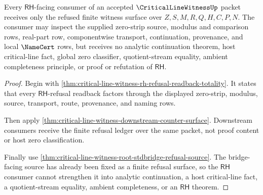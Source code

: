 \begin{theorem}
\label{thm:critical-line-witness-root-rh-refusal-exhaustion}
Every $\mathsf{RH}$-facing consumer of an accepted $\CriticalLineWitnessUp$ packet receives only the refused finite witness surface over $Z,S,M,R,Q,H,C,P,N$. The consumer may inspect the supplied zero-strip source, modulus and comparison rows, real-part row, componentwise transport, continuation, provenance, and local $\NameCert$ rows, but receives no analytic continuation theorem, host critical-line fact, global zero classifier, quotient-stream equality, ambient completeness principle, or proof or refutation of $\mathsf{RH}$.
\end{theorem}
\begin{proof}
Begin with \autoref{thm:critical-line-witness-rh-refusal-readback-totality}. It states that every $\mathsf{RH}$-refusal readback factors through the displayed zero-strip, modulus, source, transport, route, provenance, and naming rows.

Then apply \autoref{thm:critical-line-witness-downstream-counter-surface}. Downstream consumers receive the finite refusal ledger over the same packet, not proof content or host zero classification.

Finally use \autoref{thm:critical-line-witness-root-stdbridge-refusal-source}. The bridge-facing source has already been fixed as a finite refusal surface, so the $\mathsf{RH}$ consumer cannot strengthen it into analytic continuation, a host critical-line fact, a quotient-stream equality, ambient completeness, or an $\mathsf{RH}$ theorem.
\end{proof}
